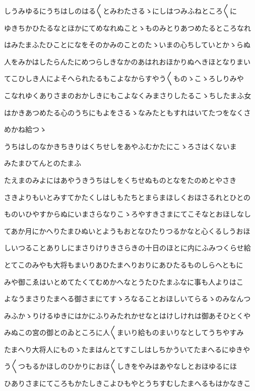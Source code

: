 \documentclass[a4paper,11pt,landscape]{ltjtarticle}
\begin{document}
しうみゆるにうちはしのはる〱とみわたさるゝにしはつみふねところ〱に
\par\medskip
ゆきちかひたるなとほかにてめなれぬことゝものみとりあつめたるところなれ
\par\medskip
はみたまふたひことになをそのかみのことのたゝいまの心ちしていとかゝらぬ
\par\medskip
人をみかはしたらんたにめつらしきなかのあはれおほかりぬへきほとなりまい
\par\medskip
てこひしき人によそへられたるもこよなからすやう〱ものゝこゝろしりみや
\par\medskip
こなれゆくありさまのおかしきにもこよなくみまさりしたるこゝちしたまふ女
\par\medskip
はかきあつめたる心のうちにもよをさるゝなみたともすれはいてたつをなくさ
\par\medskip
めかね給つゝ
\par\medskip
うちはしのなかきちきりはくちせしをあやふむかたにこゝろさはくないま
\par\medskip
みたまひてんとのたまふ
\par\medskip
たえまのみよにはあやうきうちはしをくちせぬものとなをたのめとやさき
\par\medskip
さきよりもいとみすてかたくしはしもたちとまらまほしくおほさるれとひとの
\par\medskip
ものいひやすからぬにいまさらなりこゝろやすきさまにてこそなとおほしなし
\par\medskip
てあか月にかへりたまひぬいとようもおとなひたりつるかなと心くるしうおほ
\par\medskip
しいつることありしにまさりけりきさらきの十日のほとに内にふみつくらせ給
\par\medskip
とてこのみやも大将もまいりあひたまへりおりにあひたるものしらへともに
\par\medskip
みや御こゑはいとめてたくてむめかへなとうたひたまふなに事も人よりはこ
\par\medskip
よなうまさりたまへる御さまにてすゝろなることおほしいてらるゝのみなんつ
\par\medskip
みふかゝりけるゆきにはかにふりみたれかせなとはけしけれは御あそひとくや
\par\medskip
みぬこの宮の御とのゐところに人〱まいり給ものまいりなとしてうちやすみ
\par\medskip
たまへり大将人にものゝたまはんとてすこしはしちかういてたまへるにゆきや
\par\medskip
う〱つもるかほしのひかりにおほ〱しきをやみはあやなしとおほゆるにほ
\par\medskip
ひありさまにてころもかたしきこよひもやとうちすむしたまへるもはかなきこ
\end{document}
